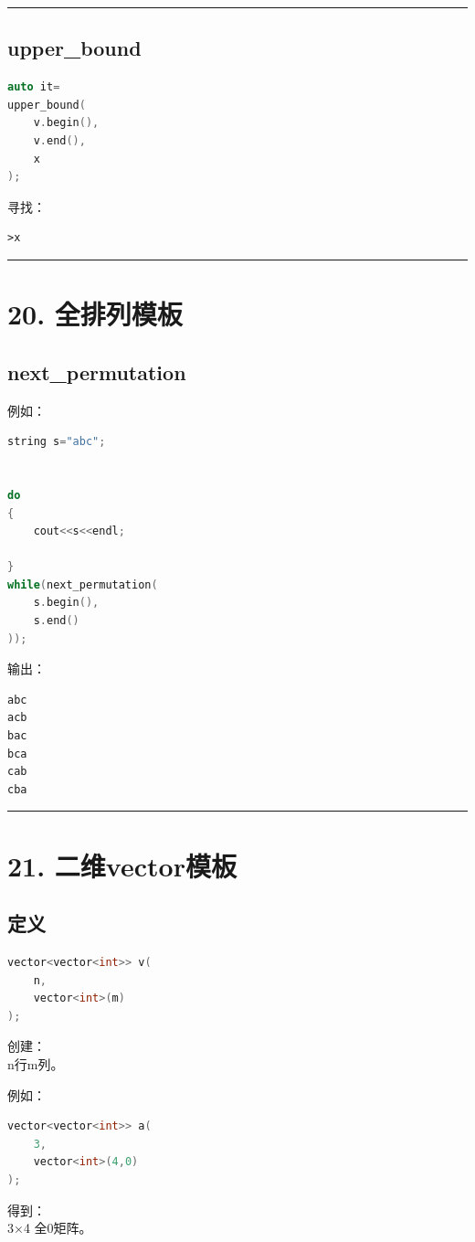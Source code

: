 \documentclass[10pt,twocolumn]{extarticle}
\begin{document}
\noindent\rule{\linewidth}{0.4pt}

\subsection{upper\_bound}
\begin{lstlisting}[language=C++]
auto it=
upper_bound(
    v.begin(),
    v.end(),
    x
);
\end{lstlisting}
寻找：
\begin{lstlisting}
>x
\end{lstlisting}

\noindent\rule{\linewidth}{0.4pt}

\section{20. 全排列模板}

\subsection{next\_permutation}
例如：
\begin{lstlisting}[language=C++]
string s="abc";


do
{
    cout<<s<<endl;

}
while(next_permutation(
    s.begin(),
    s.end()
));
\end{lstlisting}
输出：
\begin{lstlisting}
abc
acb
bac
bca
cab
cba
\end{lstlisting}

\noindent\rule{\linewidth}{0.4pt}

\section{21. 二维vector模板}

\subsection{定义}
\begin{lstlisting}[language=C++]
vector<vector<int>> v(
    n,
    vector<int>(m)
);
\end{lstlisting}
创建：\\
n行m列。

例如：
\begin{lstlisting}[language=C++]
vector<vector<int>> a(
    3,
    vector<int>(4,0)
);
\end{lstlisting}
得到：\\
3×4 全0矩阵。
\end{document}
